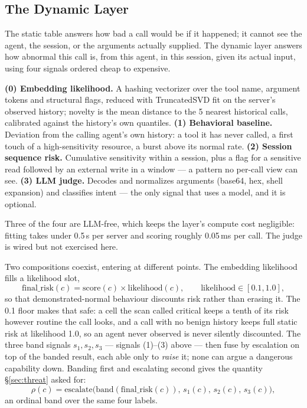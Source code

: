 \subsection{The Dynamic Layer}
\label{sec:dynamic}

The static table answers how bad a call would be if it happened; it cannot see
the agent, the session, or the arguments actually supplied. The dynamic layer
answers how abnormal this call is, from this agent, in this session, given its
actual input, using four signals ordered cheap to expensive.

\textbf{(0) Embedding likelihood.} A hashing vectorizer over the tool name,
argument tokens and structural flags, reduced with TruncatedSVD fit on the
server's observed history; novelty is the mean distance to the 5 nearest
historical calls, calibrated against the history's own quantiles.
\textbf{(1) Behavioral baseline.} Deviation from the calling agent's own
history: a tool it has never called, a first touch of a high-sensitivity
resource, a burst above its normal rate.
\textbf{(2) Session sequence risk.} Cumulative sensitivity within a session,
plus a flag for a sensitive read followed by an external write in a window ---
a pattern no per-call view can see.
\textbf{(3) LLM judge.} Decodes and normalizes arguments (base64, hex, shell
expansion) and classifies intent --- the only signal that uses a model, and it
is optional.

Three of the four are LLM-free, which keeps the layer's compute cost
negligible: fitting takes under 0.5\,s per server and scoring roughly 0.05\,ms
per call. The judge is wired but not exercised here.

Two compositions coexist, entering at different points. The embedding
likelihood fills a likelihood slot,
\begin{equation}
\mathrm{final\_risk}(c) = \mathrm{score}(c) \times \mathrm{likelihood}(c),
\qquad \mathrm{likelihood} \in [0.1, 1.0],
\label{eq:dynamic}
\end{equation}
so that demonstrated-normal behaviour discounts risk rather than erasing it.
The 0.1 floor makes that safe: a cell the scan called critical keeps a tenth of
its risk however routine the call looks, and a call with no benign history
keeps full static risk at likelihood 1.0, so an agent never observed is never
silently discounted. The three band signals $s_{1}, s_{2}, s_{3}$ --- signals
(1)--(3) above --- then fuse by escalation on top of the banded result, each
able only to \emph{raise} it; none can argue a dangerous capability down.
Banding first and escalating second gives the quantity \S\ref{sec:threat}
asked for:
\begin{equation}
\rho(c) = \mathrm{escalate}\bigl(\mathrm{band}(\mathrm{final\_risk}(c)),\,
          s_{1}(c),\, s_{2}(c),\, s_{3}(c)\bigr),
\label{eq:rho}
\end{equation}
an ordinal band over the same four labels.

